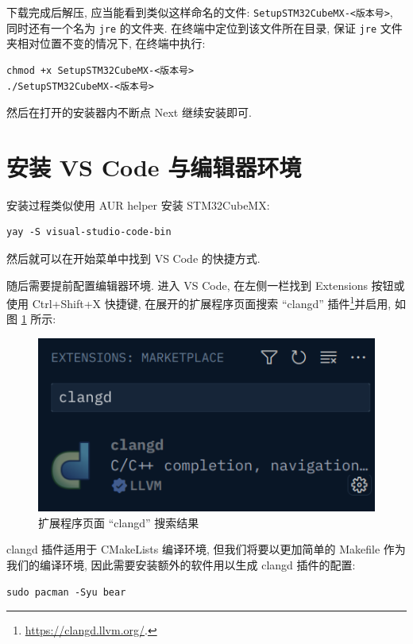 下载完成后解压, 应当能看到类似这样命名的文件: \texttt{SetupSTM32CubeMX-<版本号>}, 同时还有一个名为 \texttt{jre} 的文件夹. 在终端中定位到该文件所在目录, 保证 \texttt{jre} 文件夹相对位置不变的情况下, 在终端中执行:

\begin{verbatim}
chmod +x SetupSTM32CubeMX-<版本号>
./SetupSTM32CubeMX-<版本号>
\end{verbatim}

然后在打开的安装器内不断点 Next 继续安装即可.

\section{安装 VS Code 与编辑器环境}
安装过程类似使用 AUR helper 安装 STM32CubeMX:

\begin{verbatim}
yay -S visual-studio-code-bin
\end{verbatim}

然后就可以在开始菜单中找到 VS Code 的快捷方式.

随后需要提前配置编辑器环境. 进入 VS Code, 在左侧一栏找到 Extensions 按钮或使用 Ctrl+Shift+X 快捷键, 在展开的扩展程序页面搜索 ``clangd'' 插件\footnote{\url{https://clangd.llvm.org/}.}并启用, 如图 \ref{fig:1-env clangd} 所示:

\begin{figure}[H]
    \centering
    \includegraphics{images/1-env-clangd.png}
    \caption{扩展程序页面 ``clangd'' 搜索结果}
    \label{fig:1-env clangd}
\end{figure}

clangd 插件适用于 CMakeLists 编译环境, 但我们将要以更加简单的 Makefile 作为我们的编译环境, 因此需要安装额外的软件用以生成 clangd 插件的配置:

\begin{verbatim}
sudo pacman -Syu bear
\end{verbatim}

